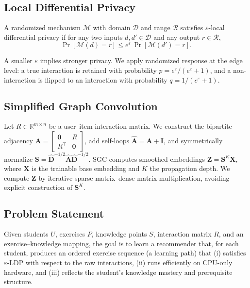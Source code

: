 \documentclass[sn-mathphys]{sn-jnl}
\begin{document}
\subsection{Local Differential Privacy}
\begin{definition}
A randomized mechanism $\mathcal{M}$ with domain $\mathcal{D}$ and range $\mathcal{R}$ satisfies $\varepsilon$-local differential privacy if for any two inputs $d,d'\in\mathcal{D}$ and any output $r\in\mathcal{R}$,
\begin{equation}
\Pr[\mathcal{M}(d)=r] \le e^{\varepsilon}\,\Pr[\mathcal{M}(d')=r].
\end{equation}
\end{definition}
A smaller $\varepsilon$ implies stronger privacy. We apply randomized response at the edge level: a true interaction is retained with probability $p=e^{\varepsilon}/(e^{\varepsilon}+1)$, and a non-interaction is flipped to an interaction with probability $q=1/(e^{\varepsilon}+1)$.

\subsection{Simplified Graph Convolution}
Let $R\in\mathbb{R}^{m\times n}$ be a user--item interaction matrix. We construct the bipartite adjacency $\mathbf{A}=\begin{bmatrix}\mathbf{0}&R\\ R^\top&\mathbf{0}\end{bmatrix}$, add self-loops $\hat{\mathbf{A}}=\mathbf{A}+\mathbf{I}$, and symmetrically normalize $\mathbf{S}=\hat{\mathbf{D}}^{-1/2}\hat{\mathbf{A}}\hat{\mathbf{D}}^{-1/2}$. SGC computes smoothed embeddings $\mathbf{Z}=\mathbf{S}^{K}\mathbf{X}$, where $\mathbf{X}$ is the trainable base embedding and $K$ the propagation depth. We compute $\mathbf{Z}$ by iterative sparse matrix--dense matrix multiplication, avoiding explicit construction of $\mathbf{S}^{K}$.

\subsection{Problem Statement}
Given students $U$, exercises $P$, knowledge points $S$, interaction matrix $R$, and an exercise--knowledge mapping, the goal is to learn a recommender that, for each student, produces an ordered exercise sequence (a learning path) that (i) satisfies $\varepsilon$-LDP with respect to the raw interactions, (ii) runs efficiently on CPU-only hardware, and (iii) reflects the student's knowledge mastery and prerequisite structure.
\end{document}

